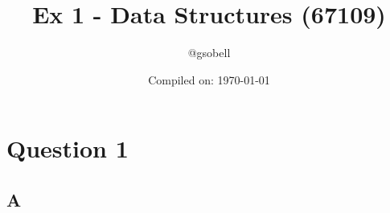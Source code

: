 \documentclass[11pt]{article}
\title{\textbf{Ex 1 - Data Structures (67109)}}
\author{@gsobell}
\date{Compiled on: \today}
\begin{document}
\maketitle
{}

\section{Question 1}
\subsection{A}
\end{document}
